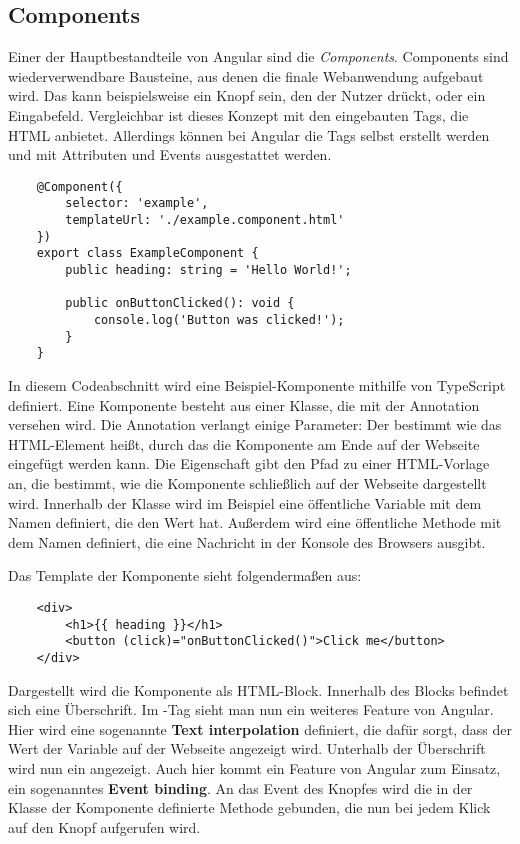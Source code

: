 \subsection{Components}

Einer der Hauptbestandteile von Angular sind die \textit{Components}. Components sind wiederverwendbare Bausteine, aus denen die finale Webanwendung aufgebaut wird. Das kann beispielsweise ein Knopf sein, den der Nutzer drückt, oder ein Eingabefeld. Vergleichbar ist dieses Konzept mit den eingebauten Tags, die HTML anbietet. Allerdings können bei Angular die Tags selbst erstellt werden und mit Attributen und Events ausgestattet werden.

\begin{verbatim}
    @Component({
        selector: 'example',
        templateUrl: './example.component.html'
    })
    export class ExampleComponent {
        public heading: string = 'Hello World!';
        
        public onButtonClicked(): void {
            console.log('Button was clicked!');
        }
    }
\end{verbatim}

In diesem Codeabschnitt wird eine Beispiel-Komponente mithilfe von TypeScript definiert. Eine Komponente besteht aus einer Klasse, die mit der  Annotation versehen wird. Die Annotation verlangt einige Parameter: Der  bestimmt wie das HTML-Element heißt, durch das die Komponente am Ende auf der Webseite eingefügt werden kann. Die Eigenschaft  gibt den Pfad zu einer HTML-Vorlage an, die bestimmt, wie die Komponente schließlich auf der Webseite dargestellt wird. Innerhalb der Klasse wird im Beispiel eine öffentliche Variable mit dem Namen  definiert, die den Wert  hat. Außerdem wird eine öffentliche Methode mit dem Namen  definiert, die eine Nachricht in der Konsole des Browsers ausgibt.

Das Template der Komponente sieht folgendermaßen aus:

\begin{verbatim}
    <div>
        <h1>{{ heading }}</h1>
        <button (click)="onButtonClicked()">Click me</button>
    </div>
\end{verbatim}

Dargestellt wird die Komponente als HTML-Block. Innerhalb des Blocks befindet sich eine Überschrift. Im -Tag sieht man nun ein weiteres Feature von Angular. Hier wird eine sogenannte \textbf{Text interpolation} definiert, die dafür sorgt, dass der Wert der Variable  auf der Webseite angezeigt wird. Unterhalb der Überschrift wird nun ein  angezeigt. Auch hier kommt ein Feature von Angular zum Einsatz, ein sogenanntes \textbf{Event binding}. An das  Event des Knopfes wird die in der Klasse der Komponente definierte Methode  gebunden, die nun bei jedem Klick auf den Knopf aufgerufen wird.

